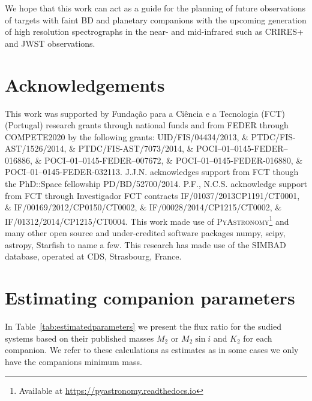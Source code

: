 \documentclass[fleqn,usenatbib]{mnras}
\newcommand*\bl{\color{blue}}
\begin{document}
    We hope that this work can act as a guide for the planning of future observations of targets with faint BD and planetary companions with the upcoming generation of high resolution spectrographs in the near- and mid-infrared such as CRIRES+ and JWST observations.
    
    
    \section*{Acknowledgements}
    This work was supported by Funda\c{c}\~ao para a Ci\^encia e a Tecnologia (FCT) (Portugal) research grants through national funds and from FEDER through COMPETE2020 by the following grants: UID/FIS/04434/2013, \&  PTDC/FIS-AST/1526/2014, \& PTDC/FIS-AST/7073/2014, \& POCI--01--0145-FEDER--016886, \& POCI--01--0145-FEDER--007672, \& POCI--01--0145-FEDER-016880, \& POCI--01--0145-FEDER-032113.
    J.J.N. acknowledges support from FCT though the PhD::Space fellowship PD/BD/52700/2014.
    P.F., N.C.S. acknowledge support from FCT through Investigador FCT contracts IF/01037/2013CP1191/CT0001, \& IF/00169/2012/CP0150/CT0002, \& IF/00028/2014/CP1215/CT0002, \& IF/01312/2014/CP1215/CT0004.
    This work made use of \textsc{PyAstronomy}\footnote{Available at \href{https://pyastronomy.readthedocs.io}{https://pyastronomy.readthedocs.io}} and many other open source and under-credited software packages numpy, scipy, astropy, Starfish to name a few.
    This research has made use of the SIMBAD database, operated at CDS, Strasbourg, France.
    
    
    
    
    \appendix
    
    \setcounter{table}{0}
    \renewcommand{\thetable}{A\arabic{table}}
    
    
    
    
    \section{Estimating companion parameters}
    
    {\bl In Table~\ref{tab:estimatedparameters} we present the flux ratio for the sudied systems based on their published masses \(M_2\) or \(M_{2}\sin{i}\) and \(K_2\) for each companion}. We refer to these calculations as estimates as in some cases we only have the companions minimum mass.
    
\end{document}
